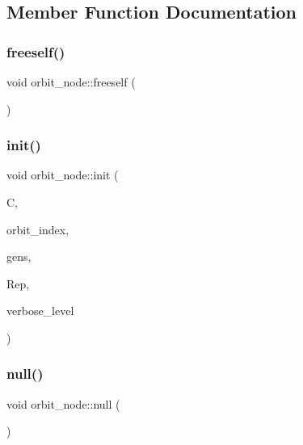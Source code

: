 \subsection{Member Function Documentation}
\mbox{\label{classorbit__node_a031cc1260a61e9431d21144f0dbeb65b}} 
\subsubsection{\texorpdfstring{freeself()}{freeself()}}
{\footnotesize\ttfamily void orbit\+\_\+node\+::freeself (\begin{DoxyParamCaption}{ }\end{DoxyParamCaption})}

\mbox{\label{classorbit__node_a9ebab01e3e2190f89c8c513e8de94487}} 
\subsubsection{\texorpdfstring{init()}{init()}}
{\footnotesize\ttfamily void orbit\+\_\+node\+::init (\begin{DoxyParamCaption}\item[{\mbox{\hyperlink{classclassification}{classification}} $\ast$}]{C,  }\item[{\mbox{\hyperlink{galois_8h_a09fddde158a3a20bd2dcadb609de11dc}{I\+NT}}}]{orbit\+\_\+index,  }\item[{\mbox{\hyperlink{classstrong__generators}{strong\+\_\+generators}} $\ast$}]{gens,  }\item[{\mbox{\hyperlink{galois_8h_a09fddde158a3a20bd2dcadb609de11dc}{I\+NT}} $\ast$}]{Rep,  }\item[{\mbox{\hyperlink{galois_8h_a09fddde158a3a20bd2dcadb609de11dc}{I\+NT}}}]{verbose\+\_\+level }\end{DoxyParamCaption})}

\mbox{\label{classorbit__node_aa61b03672f85f0cc9cac8cc1157a42d0}} 
\subsubsection{\texorpdfstring{null()}{null()}}
{\footnotesize\ttfamily void orbit\+\_\+node\+::null (\begin{DoxyParamCaption}{ }\end{DoxyParamCaption})}

